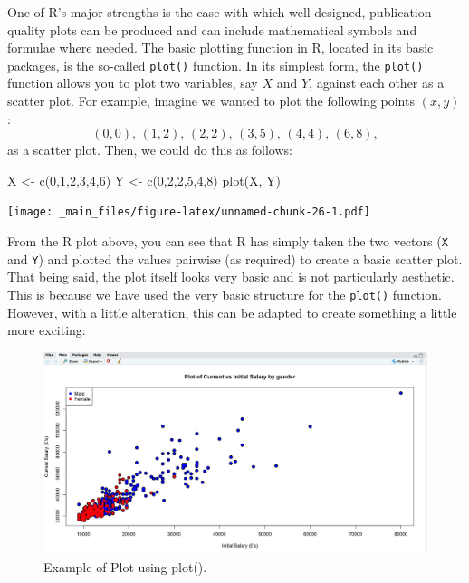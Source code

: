 \documentclass[
]{book}
\newenvironment{Shaded}{\begin{snugshade}}{\end{snugshade}}
\newcommand{\DecValTok}[1]{\textcolor[rgb]{0.00,0.00,0.81}{#1}}
\newcommand{\FunctionTok}[1]{\textcolor[rgb]{0.00,0.00,0.00}{#1}}
\newcommand{\NormalTok}[1]{#1}
\newcommand{\OtherTok}[1]{\textcolor[rgb]{0.56,0.35,0.01}{#1}}
\theoremstyle{definition}
\theoremstyle{definition}
\theoremstyle{definition}
\theoremstyle{definition}
\theoremstyle{remark}
\begin{document}
One of R's major strengths is the ease with which well-designed, publication-quality plots can be produced and can include mathematical symbols and formulae where needed. The basic plotting function in R, located in its basic packages, is the so-called \texttt{plot()} function. In its simplest form, the \texttt{plot()} function allows you to plot two variables, say \(X\) and \(Y\), against each other as a scatter plot. For example, imagine we wanted to plot the following points \((x,y)\):
\begin{equation*}
(0,0), \,(1,2),\, (2,2),\, (3, 5),\, (4, 4),\, (6, 8),
\end{equation*}
as a scatter plot. Then, we could do this as follows:

\begin{Shaded}
\begin{Highlighting}[]
\NormalTok{X }\OtherTok{\textless{}{-}} \FunctionTok{c}\NormalTok{(}\DecValTok{0}\NormalTok{,}\DecValTok{1}\NormalTok{,}\DecValTok{2}\NormalTok{,}\DecValTok{3}\NormalTok{,}\DecValTok{4}\NormalTok{,}\DecValTok{6}\NormalTok{)}
\NormalTok{Y }\OtherTok{\textless{}{-}} \FunctionTok{c}\NormalTok{(}\DecValTok{0}\NormalTok{,}\DecValTok{2}\NormalTok{,}\DecValTok{2}\NormalTok{,}\DecValTok{5}\NormalTok{,}\DecValTok{4}\NormalTok{,}\DecValTok{8}\NormalTok{)}
\FunctionTok{plot}\NormalTok{(X, Y)}
\end{Highlighting}
\end{Shaded}

\texttt{[image: \_main\_files/figure-latex/unnamed-chunk-26-1.pdf]}

From the R plot above, you can see that R has simply taken the two vectors (\texttt{X} and \texttt{Y}) and plotted the values pairwise (as required) to create a basic scatter plot. That being said, the plot itself looks very basic and is not particularly aesthetic. This is because we have used the very basic structure for the \texttt{plot()} function. However, with a little alteration, this can be adapted to create something a little more exciting:

\begin{figure}

{\centering \includegraphics[width=0.9\linewidth]{Figures/Salary2} 

}

\caption{Example of Plot using plot().}\label{fig:Plot}
\end{figure}
\end{document}
